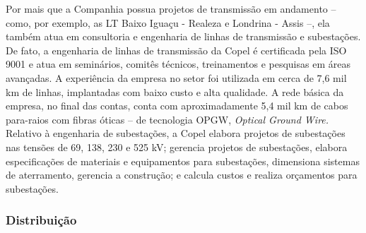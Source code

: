 \documentclass[grad,numbers]{coppe}
\begin{document}
  Por mais que a Companhia possua projetos de transmissão em andamento -- como, por exemplo, as LT Baixo Iguaçu - Realeza e Londrina - Assis --, ela também atua em consultoria e engenharia de linhas de transmissão e subestações. De fato, a engenharia de linhas de transmissão da Copel é certificada pela ISO 9001 e atua em seminários, comitês técnicos, treinamentos e pesquisas em áreas avançadas. A experiência da empresa no setor foi utilizada em cerca de 7,6 mil km de linhas, implantadas com baixo custo e alta qualidade. A rede básica da empresa, no final das contas, conta com aproximadamente 5,4 mil km de cabos para-raios com fibras óticas -- de tecnologia OPGW, \emph{Optical Ground Wire.} Relativo à engenharia de subestações, a Copel elabora projetos de subestações nas tensões de 69, 138, 230 e 525 kV; gerencia projetos de subestações, elabora especificações de materiais e equipamentos para subestações, dimensiona sistemas de aterramento, gerencia a construção; e calcula custos e realiza orçamentos para subestações.

  \hypertarget{distribuiuxe7uxe3o}{%
  \subsubsection{Distribuição}\label{distribuiuxe7uxe3o}}
\end{document}
